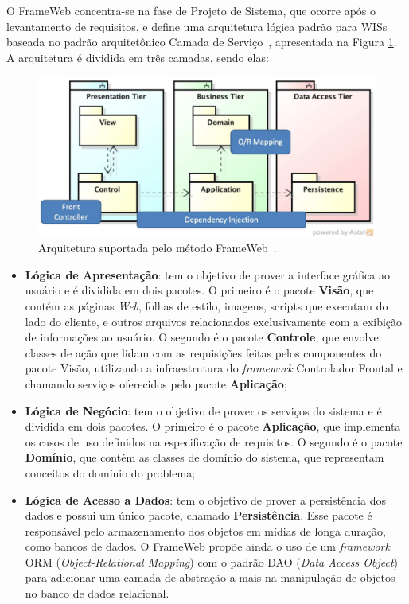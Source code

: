O FrameWeb concentra-se na fase de Projeto de Sistema, que ocorre após o levantamento
de requisitos, e define uma arquitetura lógica padrão para WISs baseada no padrão 
arquitetônico Camada de Serviço~\cite{fowler:2002}, apresentada na Figura \ref{fig-arquitetura-frameweb}.
A arquitetura é dividida em três camadas, sendo elas:

\begin{figure}
    \centering
    \includegraphics[width=.9\textwidth]{figuras/fig-arquitetura-frameweb.png} 
    \caption{Arquitetura suportada pelo método FrameWeb~\cite{souza:2020}.}
    \label{fig-arquitetura-frameweb}
\end{figure}


\begin{itemize}
    \item \textbf{Lógica de Apresentação}: tem o objetivo de prover a interface gráfica
        ao usuário e é dividida em dois pacotes. O primeiro é o pacote \textbf{Visão},
        que contém as páginas \textit{Web}, folhas de estilo, imagens, scripts que executam do lado do cliente,
        e outros arquivos relacionados exclusivamente com a exibição de informações ao usuário.
        O segundo é o pacote \textbf{Controle}, que envolve classes de ação que lidam com as requisições
        feitas pelos componentes do pacote Visão, utilizando a infraestrutura do \textit{framework} 
        Controlador Frontal e chamando serviços oferecidos pelo pacote \textbf{Aplicação};

    \item \textbf{Lógica de Negócio}: tem o objetivo de prover os serviços do sistema e é dividida
        em dois pacotes. O primeiro é o pacote \textbf{Aplicação}, que implementa os casos de uso 
        definidos na especificação de requisitos. O segundo é o pacote \textbf{Domínio}, que contém 
        as classes de domínio do sistema, que representam conceitos do domínio do problema;

    \item \textbf{Lógica de Acesso a Dados}: tem o objetivo de prover a persistência dos dados e 
        possui um único pacote, chamado \textbf{Persistência}. Esse pacote é responsável pelo armazenamento
        dos objetos em mídias de longa duração, como bancos de dados. O FrameWeb propõe ainda o uso de um
        \textit{framework} ORM (\textit{Object-Relational Mapping}) com o padrão DAO (\textit{Data Access Object})~\cite{alur:2003}
        para adicionar uma camada de abstração a mais na manipulação de objetos no banco de dados relacional.
\end{itemize}

